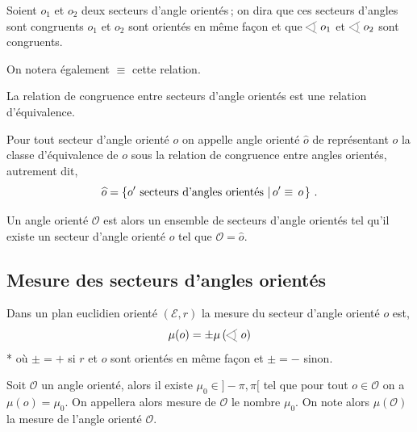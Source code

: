\begin{defi}
Soient $o_1$ et $o_2$ deux secteurs d'angle orientés\,; on dira que ces secteurs d'angles sont congruents \ssi $o_1$ et $o_2$ sont orientés en même façon et que $\anglesaillant o_1$ et $\anglesaillant o_2$ sont congruents. 

On notera également $\equiv$ cette relation.
\end{defi}
\begin{prop}
    La relation de congruence entre secteurs d'angle orientés est une relation d'équivalence.
\end{prop}
\begin{defi}
    Pour tout secteur d'angle orienté $o$ on appelle angle orienté $\widehat{o}$ de représentant $o$ la classe d'équivalence de $o$ sous la relation de congruence entre angles orientés, autrement dit,
    \begin{equation*}
        \widehat{o} = \left\{o' \text{ secteurs d'angles orient\'es}\,\left|\,o' \equiv \, o\right.\right\}\,.
    \end{equation*}
    
    Un angle orienté $\mathcal{O}$ est alors un ensemble de secteurs d'angle orientés tel qu'il existe un secteur d'angle orienté $o$ tel que $\mathcal{O}=\widehat{o}$. 
\end{defi}

        \subsection{Mesure des secteurs d'angles orientés}

\begin{defi}
    Dans un plan euclidien orienté $(\mathcal{E},r)$ la mesure du secteur d'angle orienté $o$ est,
    \begin{equation*}
        \mu(o) = \pm \mu\left(\anglesaillant o\right)
    \end{equation*}*
    où $\pm = +$ si $r$ et $o$ sont orientés en même façon et $\pm = -$ sinon.
\end{defi}
\begin{thm}
    Soit $\mathcal{O}$ un angle orienté, alors il existe $\mu_0\in ]-\pi,\pi[$ tel que pour tout $o\in \mathcal{O}$ on a $\mu(o)=\mu_0$. On appellera alors mesure de $\mathcal{O}$ le nombre $\mu_0$. On note alors $\mu\left(\mathcal{O}\right)$ la mesure de l'angle orienté $\mathcal{O}$.  
\end{thm}
